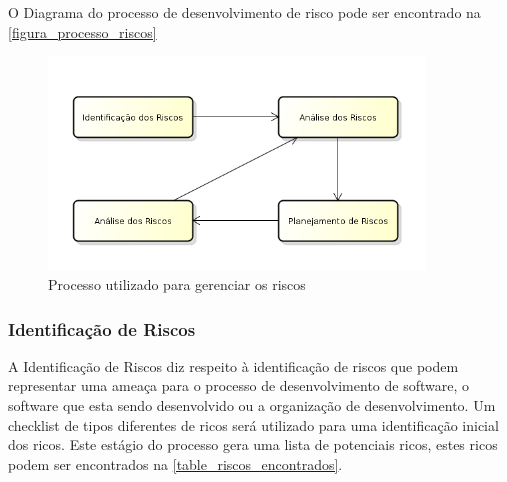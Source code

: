 O Diagrama do processo de desenvolvimento de risco pode ser encontrado na 
\autoref{figura_processo_riscos}

\begin{figure}[H]
\centering
\includegraphics[width=10cm]{figuras/figura_processo_riscos}
\caption{Processo utilizado para gerenciar os riscos}
\label{figura_processo_riscos}
\end{figure}

\subsubsection{Identificação de Riscos}
A Identificação de Riscos diz respeito à identificação de riscos que podem 
representar uma ameaça para o processo de desenvolvimento de software, o 
software que esta sendo desenvolvido ou a organização de desenvolvimento. Um 
checklist de tipos diferentes de ricos será utilizado para uma identificação 
inicial dos ricos. Este estágio do processo gera uma lista de potenciais ricos, 
estes ricos podem ser encontrados na \autoref{table_riscos_encontrados}.

